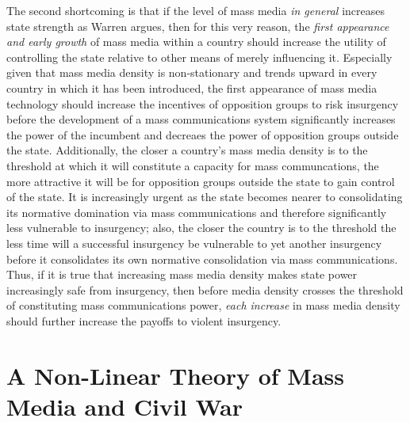 \documentclass[11pt,article,oneside]{memoir}
\begin{document}
The second shortcoming is that if the level of mass media \emph{in
general} increases state strength as Warren argues, then for this very
reason, the \emph{first appearance and early growth} of mass media
within a country should increase the utility of controlling the state
relative to other means of merely influencing it. Especially given that
mass media density is non-stationary and trends upward in every country
in which it has been introduced, the first appearance of mass media
technology should increase the incentives of opposition groups to risk
insurgency before the development of a mass communications system
significantly increases the power of the incumbent and decreaes the
power of opposition groups outside the state. Additionally, the closer a
country's mass media density is to the threshold at which it will
constitute a capacity for mass communcations, the more attractive it
will be for opposition groups outside the state to gain control of the
state. It is increasingly urgent as the state becomes nearer to
consolidating its normative domination via mass communications and
therefore significantly less vulnerable to insurgency; also, the closer
the country is to the threshold the less time will a successful
insurgency be vulnerable to yet another insurgency before it
consolidates its own normative consolidation via mass communications.
Thus, if it is true that increasing mass media density makes state power
increasingly safe from insurgency, then before media density crosses the
threshold of constituting mass communications power, \emph{each
increase} in mass media density should further increase the payoffs to
violent insurgency.

\section{A Non-Linear Theory of Mass Media and Civil
War}\label{a-non-linear-theory-of-mass-media-and-civil-war}
\end{document}
